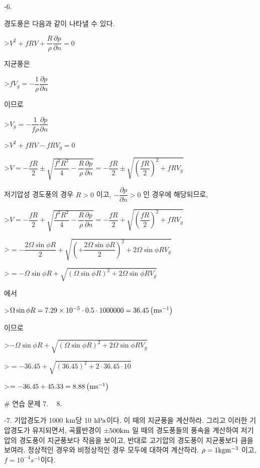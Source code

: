 -6. 


경도풍은 다음과 같이 나타낼 수 있다.

>$ V^{2} + fRV + \dfrac{R}{\rho} \dfrac{\partial p}{\partial n} = 0$

지균풍은 

>$f V_{g} = -\dfrac{1}{\rho}\dfrac{\partial p}{\partial n}$ 

이므로 

>$V_{g} = -\dfrac{1}{f \rho}\dfrac{\partial p}{\partial n}$ 

>$ V^{2} + fRV - f R V_{g} = 0$


>$ V = -\dfrac{fR}{2} \pm \sqrt{ \dfrac{f^{2} R^{2}}{4} - \dfrac{R}{\rho}\dfrac{\partial p}{\partial n} } = -\dfrac{fR}{2} \pm \sqrt{ {\left(\dfrac{f R}{2} \right)}^{2} + f R V_{g} }$


저기압성 경도풍의 경우 $ R > 0$ 이고, $- \dfrac{\partial p}{\partial n} > 0$ 인 경우에 해당되므로, 

>$ V = -\dfrac{fR}{2} + \sqrt{ \dfrac{f^{2} R^{2}}{4} - \dfrac{R}{\rho}\dfrac{\partial p}{\partial n} } = -\dfrac{fR}{2} + \sqrt{ {\left(\dfrac{f R}{2} \right)}^{2} + f R V_{g} }$

>$ =  -\dfrac{ 2 \Omega \sin \phi R}{2} + \sqrt{ {\left(+\dfrac{ 2 \Omega \sin \phi R}{2} \right)}^{2} + 2 \Omega \sin \phi R V_{g} } $

>$ =  -\Omega \sin \phi R + \sqrt{ {\left(\Omega \sin \phi R \right)}^{2} + 2 \Omega \sin \phi R V_{g} } $

에서 

>$ \Omega \sin \phi R = 7.29 \times 10^{-5} \cdot 0.5 \cdot 1000000 =  36.45  \left( \rm m s^{-1} \right)$

이므로

>$ -\Omega \sin \phi R + \sqrt{ {\left(\Omega \sin \phi R \right)}^{2} + 2 \Omega \sin \phi R V_{g} }$

>$= -36.45+ \sqrt{ {\left(36.45 \right)}^{2} + 2 \cdot 36.45 \cdot 10 } $

>$ = -36.45+ 45.33 = 8.88 \left( \rm m s^{-1} \right)$




# 연습 문제 7. ~ 8. 


-7. 기압경도가 1000 $\rm km$당 10 $\rm hPa $이다. 이 때의 지균풍을 계산하라. 그리고 이러한 기압경도가 유지되면서, 곡률반경이 $\pm 500 \rm km$ 일 때의 경도풍들의 풍속을 계산하여 저기압의 경도풍이 지균풍보다 작음을 보이고, 반대로 고기압의 경도풍이 지균풍보다 큼을 보여라. 정상적인 경우와 비정상적인 경우 모두에 대하여 계산하라. $\rho = 1 \rm kg m^{-3}$ 이고, $ f = 10^{-4} s^{-1}$이다. 


